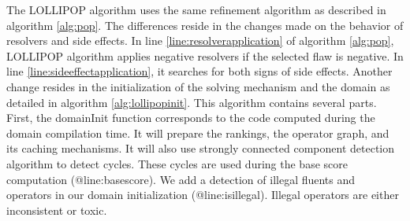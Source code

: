 \documentclass[11pt,a4paper,twoside,openright,titlepage,numbers=noenddot,headinclude,cleardoublepage=empty,openany]{scrreprt}
\theoremstyle{plain}
\theoremstyle{definition}
\theoremstyle{remark}
\begin{document}
The LOLLIPOP algorithm uses the same refinement algorithm as described
in algorithm \ref{alg:pop}. The differences reside in the changes made
on the behavior of resolvers and side effects. In
line \ref{line:resolverapplication} of algorithm \ref{alg:pop}, LOLLIPOP
algorithm applies negative resolvers if the selected flaw is negative.
In line \ref{line:sideeffectapplication}, it searches for both signs of
side effects. Another change resides in the initialization of the
solving mechanism and the domain as detailed in
algorithm \ref{alg:lollipopinit}. This algorithm contains several parts.
First, the {domainInit} function corresponds to the code computed during
the domain compilation time. It will prepare the rankings, the operator
graph, and its caching mechanisms. It will also use strongly connected
component detection algorithm to detect cycles. These cycles are used
during the base score computation (@line:basescore). We add a detection
of illegal fluents and operators in our domain initialization
(@line:isillegal). Illegal operators are either inconsistent or toxic.
\end{document}

